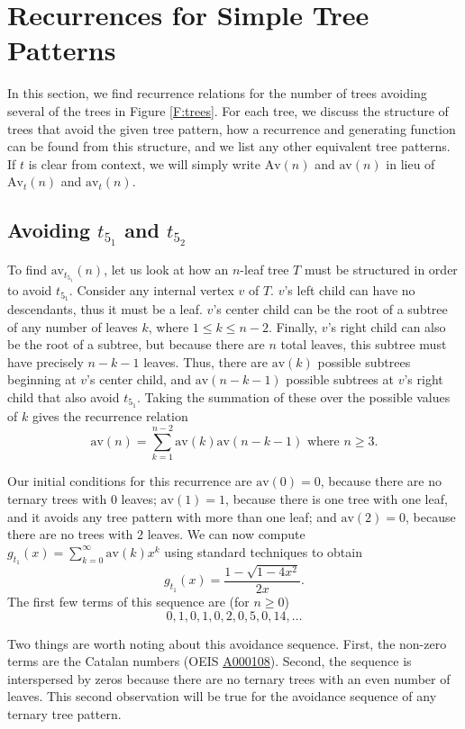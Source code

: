\documentclass[12pt]{article}
\newcommand{\seqnum}[1]{\href{http://oeis.org/#1}{\underline{#1}}}
\begin{document}
\section{Recurrences for Simple Tree Patterns}\label{S:recs}

In this section, we find recurrence relations for the number of trees avoiding several of the trees in Figure \ref{F:trees}.  For each tree, we discuss the structure of trees that avoid the given tree pattern, how a recurrence and generating function can be found from this structure, and we list any other equivalent tree patterns.  If $t$ is clear from context, we will simply write $\text{Av}(n)$ and $\text{av}(n)$ in lieu of $\text{Av}_t(n)$ and $\text{av}_t(n)$.

\subsection{Avoiding \texorpdfstring{$t_{5_1}$}{t51} and \texorpdfstring{$t_{5_2}$}{t52}}

To find $\text{av}_{t_{5_1}}(n)$, let us look at how an $n$-leaf tree $T$ must be structured in order to avoid $t_{5_1}$. Consider any internal vertex $v$ of $T$.  $v$'s left child can have no descendants, thus it must be a leaf. $v$'s center child can be the root of a subtree of any number of leaves $k$, where $1 \leq k \leq n-2$.  Finally, $v$'s right child can also be the root of a subtree, but because there are $n$ total leaves, this subtree must have precisely $n-k-1$ leaves.  Thus, there are $\text{av}(k)$ possible subtrees beginning at $v$'s center child, and $\text{av}(n-k-1)$ possible subtrees at $v$'s right child that also avoid $t_{5_1}$.  Taking the summation of these over the possible values of $k$ gives the recurrence relation $$\text{av}(n)=\sum_{k=1}^{n-2} \text{av}(k) \text{av}(n-k-1) \text{ where } n \geq 3.$$

Our initial conditions for this recurrence are $\text{av}(0) = 0$, because there are no ternary trees with 0 leaves; $\text{av}(1) = 1$, because there is one tree with one leaf, and it avoids any tree pattern with more than one leaf; and $\text{av}(2) = 0$, because there are no trees with 2 leaves.  We can now compute $g_{t_1}(x) = \sum_{k=0}^\infty \text{av}(k) x^k$ using standard techniques to obtain
$$g_{t_1}(x)=\frac{1 - \sqrt{1-4x^2}}{2x}.$$  The first few terms of this sequence are (for $n \geq 0$) $$0,1,0,1,0,2,0,5,0,14,\dots$$

Two things are worth noting about this avoidance sequence.  First, the non-zero terms are the Catalan numbers (OEIS \seqnum{A000108}).  Second, the sequence  is interspersed by zeros because there are no ternary trees with an even number of leaves.  This second observation will be true for the avoidance sequence of any ternary tree pattern.
\end{document}

